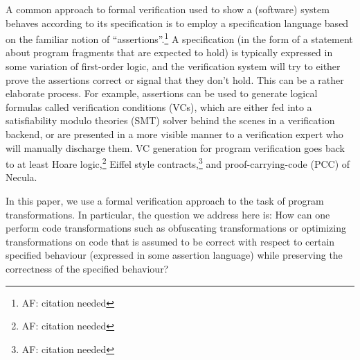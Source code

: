 \documentclass[compsoc,conference,a4paper,10pt,times]{IEEEtran}
\begin{document}
A common approach to formal verification used to show a (software) system behaves according to its specification is to employ a specification language based on the familiar notion of ``assertions''.\footnote{AF: citation needed} A specification (in the form of a statement about program fragments that are expected to hold) is typically expressed in some variation of first-order logic, and the verification system will try to either prove the assertions correct or signal that they don't hold. This can be a rather elaborate process.  For example, assertions can be used to generate logical formulas called verification conditions (VCs), which are either fed into a satisfiability modulo theories (SMT) solver behind the scenes in a verification backend, or are presented in a more visible manner to a verification expert who will manually discharge them. VC generation for program verification goes back to at least Hoare logic,\footnote{AF: citation needed} Eiffel style contracts,\footnote{AF: citation needed} and proof-carrying-code (PCC) of Necula\cite{b7}.

In this paper, we use a formal verification approach to the task of program transformations.
In particular, the question we address here is:
How can one perform code transformations such as obfuscating transformations or optimizing transformations on code that is assumed to be correct with respect to certain specified behaviour (expressed in some assertion language) while preserving the correctness of the specified behaviour?
\end{document}
